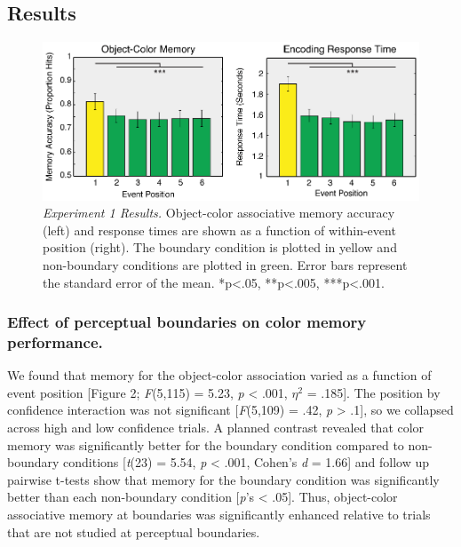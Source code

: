 \subsection{Results}\label{results}

\begin{figure}
  \centering
  \includegraphics[width=\textwidth]{figures/chapter1_figure2.eps}
  \caption[Behavioral Experiment 1 Results]{\textit{Experiment 1 Results.} Object-color associative memory accuracy (left) and response times are shown as a function of within-event position (right).  The boundary condition is plotted in yellow and non-boundary conditions are plotted in green.  Error bars represent the standard error of the mean. *p<.05, **p<.005, ***p<.001.}
  \label{chapter1_figure2}
\end{figure}

\subsubsection{Effect of perceptual boundaries on color memory
performance.}\label{effect-of-perceptual-boundaries-on-color-memory-performance.}

We found that memory for the object-color association varied as a
function of event position {[}Figure 2; \emph{F}(5,115) = 5.23, \emph{p}
\textless{} .001, \(\eta^{2}\) = .185{]}. The position by confidence
interaction was not significant {[}\emph{F}(5,109) = .42, \emph{p}
\textgreater{} .1{]}, so we collapsed across high and low confidence
trials. A planned contrast revealed that color memory was significantly
better for the boundary condition compared to non-boundary conditions
{[}\emph{t}(23) = 5.54, \emph{p} \textless{} .001, Cohen's \emph{d} =
1.66{]} and follow up pairwise t-tests show that memory for the boundary
condition was significantly better than each non-boundary condition
{[}\emph{p}'s \textless{} .05{]}. Thus, object-color associative memory
at boundaries was significantly enhanced relative to trials that are not
studied at perceptual boundaries.


